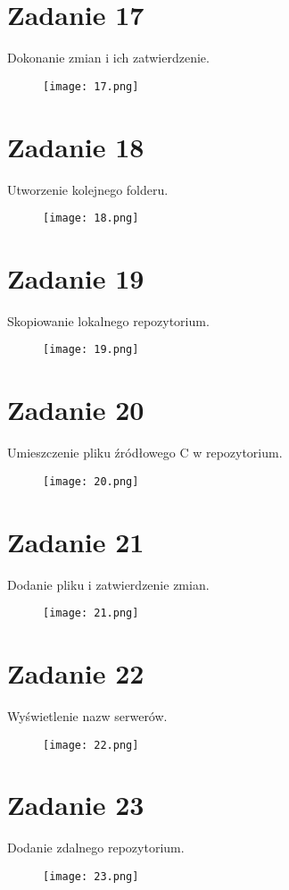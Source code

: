 \documentclass[fleqn,onecolumn,a4paper,12pt,titlepage]{article}
\begin{document}
\section*{Zadanie 17}
Dokonanie zmian i ich zatwierdzenie.
\begin{figure}[H]%
    \centering\texttt{[image: 17.png]}
\end{figure}

\section*{Zadanie 18}
Utworzenie kolejnego folderu.
\begin{figure}[H]%
    \centering\texttt{[image: 18.png]}
\end{figure}

\section*{Zadanie 19}
Skopiowanie lokalnego repozytorium.
\begin{figure}[H]%
    \centering\texttt{[image: 19.png]}
\end{figure}

\section*{Zadanie 20}
Umieszczenie pliku źródłowego C w repozytorium.
\begin{figure}[H]%
    \centering\texttt{[image: 20.png]}
\end{figure}

\section*{Zadanie 21}
Dodanie pliku i zatwierdzenie zmian.
\begin{figure}[H]%
    \centering\texttt{[image: 21.png]}
\end{figure}

\section*{Zadanie 22}
Wyświetlenie nazw serwerów.
\begin{figure}[H]%
    \centering\texttt{[image: 22.png]}
\end{figure}

\section*{Zadanie 23}
Dodanie zdalnego repozytorium.
\begin{figure}[H]%
    \centering\texttt{[image: 23.png]}
\end{figure}
\end{document}

